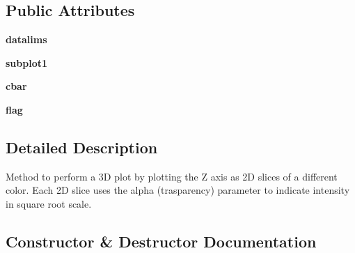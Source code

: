 \subsection*{Public Attributes}
\begin{DoxyCompactItemize}
\item 
\hypertarget{class_uni_dec_1_1unidec__modules_1_1_color_plot_1_1_color_plot2_d_a66382e3fd49a057200b557def507ab7e}{}{\bfseries datalims}\label{class_uni_dec_1_1unidec__modules_1_1_color_plot_1_1_color_plot2_d_a66382e3fd49a057200b557def507ab7e}

\item 
\hypertarget{class_uni_dec_1_1unidec__modules_1_1_color_plot_1_1_color_plot2_d_a4b77874dba36d3993a9982eaaee8b2a6}{}{\bfseries subplot1}\label{class_uni_dec_1_1unidec__modules_1_1_color_plot_1_1_color_plot2_d_a4b77874dba36d3993a9982eaaee8b2a6}

\item 
\hypertarget{class_uni_dec_1_1unidec__modules_1_1_color_plot_1_1_color_plot2_d_a975cdd0424ec754bfbec10000db509bf}{}{\bfseries cbar}\label{class_uni_dec_1_1unidec__modules_1_1_color_plot_1_1_color_plot2_d_a975cdd0424ec754bfbec10000db509bf}

\item 
\hypertarget{class_uni_dec_1_1unidec__modules_1_1_color_plot_1_1_color_plot2_d_a6b5570a383c51b350d734c1584b0d361}{}{\bfseries flag}\label{class_uni_dec_1_1unidec__modules_1_1_color_plot_1_1_color_plot2_d_a6b5570a383c51b350d734c1584b0d361}

\end{DoxyCompactItemize}


\subsection{Detailed Description}
\begin{DoxyVerb}Method to perform a 3D plot by plotting the Z axis as 2D slices of a different color.
Each 2D slice uses the alpha (trasparency) parameter to indicate intensity in square root scale.
\end{DoxyVerb}
 

\subsection{Constructor \& Destructor Documentation}
\hypertarget{class_uni_dec_1_1unidec__modules_1_1_color_plot_1_1_color_plot2_d_aca0a8f7969dcb4fdca4ac0cacc33abb2}{}
